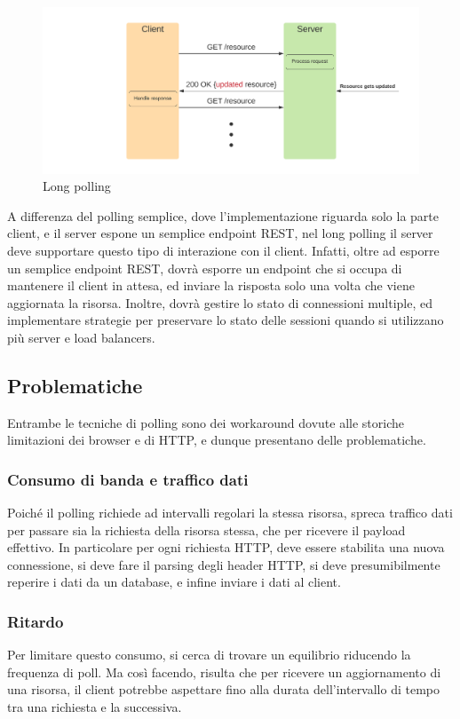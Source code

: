 \documentclass[12pt,a4paper,openright,twoside]{report}
\begin{document}
\begin{description}
\begin{figure}[htbp]
\centering
\includegraphics[width=.8\textwidth]{assets/long_polling.png}
\caption{Long polling}
\end{figure}

A differenza del polling semplice, dove l’implementazione riguarda solo la parte client, e il server espone un semplice endpoint REST, nel long polling il server deve supportare questo tipo di interazione con il client. Infatti, oltre ad esporre un semplice endpoint REST, dovrà esporre un endpoint che si occupa di mantenere il client in attesa, ed inviare la risposta solo una volta che viene aggiornata la risorsa. Inoltre, dovrà gestire lo stato di connessioni multiple, ed implementare strategie per preservare lo stato delle sessioni quando si utilizzano più server e load balancers.

\end{description}

\subsection{Problematiche}
Entrambe le tecniche di polling sono dei workaround dovute alle storiche limitazioni dei browser e di HTTP, e dunque presentano delle problematiche. 
\subsubsection{Consumo di banda e traffico dati}
Poiché il polling richiede ad intervalli regolari la stessa risorsa, spreca traffico dati per passare sia la richiesta della risorsa stessa, che per ricevere il payload effettivo. In particolare per ogni richiesta HTTP, deve essere stabilita una nuova connessione, si deve fare il parsing degli header HTTP, si deve presumibilmente reperire i dati da un database, e infine inviare i dati al client.

\subsubsection{Ritardo}
Per limitare questo consumo, si cerca di trovare un equilibrio riducendo la frequenza di poll. Ma così facendo, risulta che per ricevere un aggiornamento di una risorsa, il client potrebbe aspettare fino alla durata dell’intervallo di tempo tra una richiesta e la successiva.
\end{document}
